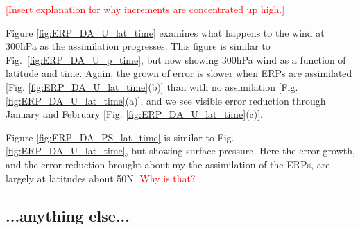 \documentclass[draft,jgrga]{agutex}
\begin{document}
\begin{article}
\textcolor{red}{[Insert explanation for why increments are concentrated up high.]}

Figure \ref{fig:ERP_DA_U_lat_time} examines what happens to the wind at 300hPa as the assimilation progresses. 
This figure is similar to Fig.~\ref{fig:ERP_DA_U_p_time}, but now showing 300hPa wind as a function of latitude and time.
Again, the grown of error is slower when ERPs are assimilated [Fig. \ref{fig:ERP_DA_U_lat_time}(b)] than with no assimilation [Fig. \ref{fig:ERP_DA_U_lat_time}(a)], and we see visible error reduction through January and February [Fig. \ref{fig:ERP_DA_U_lat_time}(c)].

Figure \ref{fig:ERP_DA_PS_lat_time} is similar to Fig. \ref{fig:ERP_DA_U_lat_time}, but showing surface pressure.
Here the error growth, and the error reduction brought about my the assimilation of the ERPs, are largely at latitudes about 50\degree N.
\textcolor{red}{Why is that?}

\subsection{...anything else...}


%
%
%
%
%
%
%


\end{article}
\end{document}
